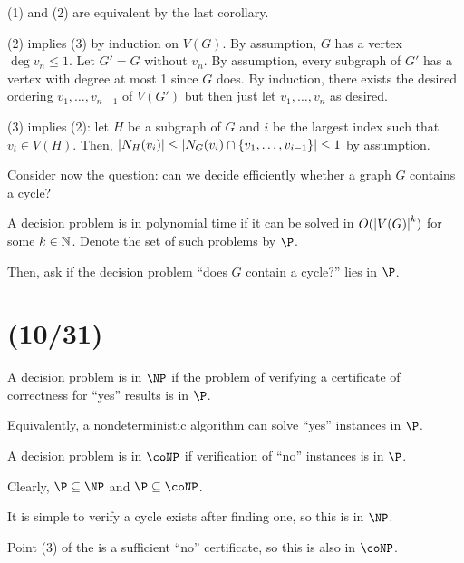 \begin{prf}
  (1) and (2) are equivalent by the last corollary.

  (2) implies (3) by induction on $V(G)$.
  By assumption, $G$ has a vertex $\deg v_n \leq 1$.
  Let $G' = G$ without $v_n$.
  By assumption, every subgraph of $G'$ has a vertex with degree at most 1 since $G$ does.
  By induction, there exists the desired ordering $v_1,\dotsc,v_{n-1}$ of $V(G')$
  but then just let $v_1,\dotsc,v_n$ as desired.

  (3) implies (2): let $H$ be a subgraph of $G$
  and $i$ be the largest index such that $v_i \in V(H)$.
  Then, $\abs{N_H(v_i)} \leq \abs{N_G(v_i) \cap \{v_1,\dotsc,v_{i-1}\}} \leq 1$
  by assumption.
\end{prf}

Consider now the question: can we decide efficiently whether a graph $G$ contains a cycle?

\begin{defn}
  A decision problem is in polynomial time if it can be solved in
  $O(\abs{V(G)}^k)$ for some $k \in \mathbb{N}$.
  Denote the set of such problems by $\P$.
\end{defn}

Then, ask if the decision problem ``does $G$ contain a cycle?'' lies in $\P$.

\section{(10/31)}

\begin{defn}
  A decision problem is in $\NP$ if the problem of verifying
  a certificate of correctness for ``yes'' results is in $\P$.

  Equivalently, a nondeterministic algorithm can solve ``yes'' instances in $\P$.
\end{defn}
\begin{defn}
  A decision problem is in $\coNP$ if verification of ``no'' instances is in $\P$.
\end{defn}

\begin{remark}
  Clearly, $\P \subseteq \NP$ and $\P \subseteq \coNP$.
\end{remark}

It is simple to verify a cycle exists after finding one, so this is in $\NP$.

Point (3) of the  is a sufficient ``no'' certificate,
so this is also in $\coNP$.


